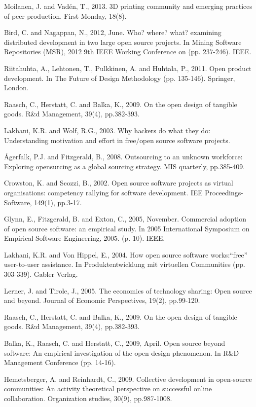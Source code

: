Moilanen, J. and Vadén, T., 2013. 3D printing community and emerging practices of peer production. First Monday, 18(8).





Bird, C. and Nagappan, N., 2012, June. Who? where? what? examining distributed development in two large open source projects. In Mining Software Repositories (MSR), 2012 9th IEEE Working Conference on (pp. 237-246). IEEE.


Riitahuhta, A., Lehtonen, T., Pulkkinen, A. and Huhtala, P., 2011. Open product development. In The Future of Design Methodology (pp. 135-146). Springer, London.

Raasch, C., Herstatt, C. and Balka, K., 2009. On the open design of tangible goods. R&d Management, 39(4), pp.382-393.


Lakhani, K.R. and Wolf, R.G., 2003. Why hackers do what they do: Understanding motivation and effort in free/open source software projects.

Ågerfalk, P.J. and Fitzgerald, B., 2008. Outsourcing to an unknown workforce: Exploring opensurcing as a global sourcing strategy. MIS quarterly, pp.385-409.


Crowston, K. and Scozzi, B., 2002. Open source software projects as virtual organisations: competency rallying for software development. IEE Proceedings-Software, 149(1), pp.3-17.

Glynn, E., Fitzgerald, B. and Exton, C., 2005, November. Commercial adoption of open source software: an empirical study. In 2005 International Symposium on Empirical Software Engineering, 2005. (p. 10). IEEE.

Lakhani, K.R. and Von Hippel, E., 2004. How open source software works:“free” user-to-user assistance. In Produktentwicklung mit virtuellen Communities (pp. 303-339). Gabler Verlag.


Lerner, J. and Tirole, J., 2005. The economics of technology sharing: Open source and beyond. Journal of Economic Perspectives, 19(2), pp.99-120.

Raasch, C., Herstatt, C. and Balka, K., 2009. On the open design of tangible goods. R&d Management, 39(4), pp.382-393.

Balka, K., Raasch, C. and Herstatt, C., 2009, April. Open source beyond software: An empirical investigation of the open design phenomenon. In R&D Management Conference (pp. 14-16).

Hemetsberger, A. and Reinhardt, C., 2009. Collective development in open-source communities: An activity theoretical perspective on successful online collaboration. Organization studies, 30(9), pp.987-1008.


